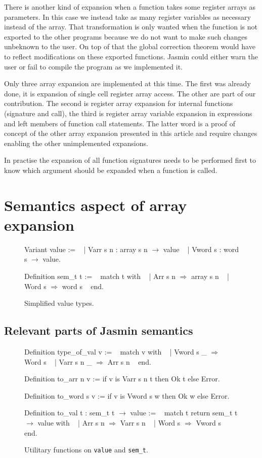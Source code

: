 \documentclass{article}
\begin{document}
\medskip

There is another kind of expansion when a function takes some register arrays as
parameters. In this case we instead take as many register variables as necessary
instead of the array. That transformation is only wanted when the function is
not exported to the other programs because we do not want to make such changes
unbeknown to the user. On top of that the global correction theorem would have
to reflect modifications on these exported functions. Jasmin could either warn
the user or fail to compile the program as we implemented it.

Only three array expansion are implemented at this time. The first was already
done, it is expansion of single cell register array access. The other are part
of our contribution. The second is register array expansion for internal
functions (signature and call), the third is register array variable expansion
in expressions and left members of function call statements. The latter word is
a proof of concept of the other array expansion presented in this article and
require changes enabling the other unimplemented expansions.

In practise the expansion of all function signatures needs to be performed first
to know which argument should be expanded when a function is called.


\section{Semantics aspect of array expansion}\label{sec:semantics}

\begin{figure}[t]
\obeylines\obeyspaces\ttfamily%
Variant value :=
~ | Varr s n : array s n \(\rightarrow\) value
~ | Vword s  : word  s   \(\rightarrow\) value.

Definition sem\_t t :=
~ match t with
~ | Arr s n \(\Rightarrow\) array s n
~ | Word s  \(\Rightarrow\) word  s
~ end.
\normalfont%
\caption{Simplified value types.}\label{fig:val}
\end{figure}

\subsection{Relevant parts of Jasmin semantics}

\begin{figure}[t]
\obeylines\obeyspaces\ttfamily%
Definition type\_of\_val v :=
~ match v with
~ | Vword s  \_ \(\Rightarrow\) Word s
~ | Varr s n \_ \(\Rightarrow\) Arr s n
~ end.

Definition to\_arr  n v := if v is Varr s n t then Ok t else Error.

Definition to\_word s v := if v is Vword s  w then Ok w else Error.

Definition to\_val t : sem\_t t \(\rightarrow\) value :=
~ match t return sem\_t t \(\rightarrow\) value with
~ | Arr s n \(\Rightarrow\) Varr s n
~ | Word s  \(\Rightarrow\) Vword s
~ end.
\normalfont%
\caption{Utilitary functions on \texttt{value} and \texttt{sem\_t}.}
\end{figure}
\end{document}
